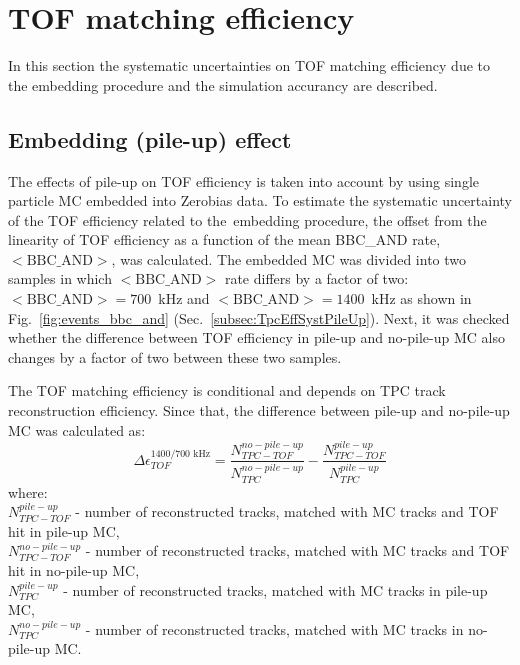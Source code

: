 \section{TOF matching efficiency}\label{sec:tofSystematics}
In this section the systematic uncertainties on TOF matching efficiency due to the embedding procedure and the simulation accurancy are described.
\subsection{Embedding (pile-up) effect}\label{sec:tofSystematicsPileUpEffect}
The effects of pile-up on TOF efficiency is taken into account by using single particle MC embedded into Zerobias data. To estimate the systematic uncertainty of the TOF efficiency related to the~embedding procedure, the offset from the linearity of TOF efficiency  as a function of the mean BBC\_AND rate, $<\text{BBC\_AND}>$, was calculated. The embedded MC was divided into two samples in which $<\text{BBC\_AND}>$ rate differs by a factor of two: \mbox{$<\text{BBC\_AND}>=700$~kHz} and \mbox{$<\text{BBC\_AND}>=1400$~kHz} as shown in Fig.~\ref{fig:events_bbc_and} (Sec.~\ref{subsec:TpcEffSystPileUp}).
Next, it was checked whether the difference between TOF efficiency in pile-up and no-pile-up MC also changes by a factor of two between these two samples.

\noindent
The TOF matching efficiency is conditional and depends on TPC track reconstruction efficiency. Since that, the difference between pile-up and  no-pile-up MC was calculated as:
\begin{equation}
\Delta\epsilon_{ TOF}^{1400/700\text{ kHz}}=\frac{N_{TPC-TOF}^{no-pile-up}}{N_{TPC}^{no-pile-up}}-\frac{N_{TPC-TOF}^{pile-up}}{N_{TPC}^{pile-up}}
\label{eq:tofSyst}
\end{equation}
where:\\
$N_{TPC-TOF}^{pile-up}$ - number of reconstructed tracks, matched with MC tracks and TOF hit in pile-up MC,\\
$N_{TPC-TOF}^{no-pile-up}$ - number of reconstructed tracks, matched with MC tracks and TOF hit in no-pile-up MC,\\
$N_{TPC}^{pile-up}$ - number of reconstructed tracks, matched with MC tracks in pile-up MC,\\
$N_{TPC}^{no-pile-up}$ - number of reconstructed tracks, matched with MC tracks in no-pile-up MC.
\newline

